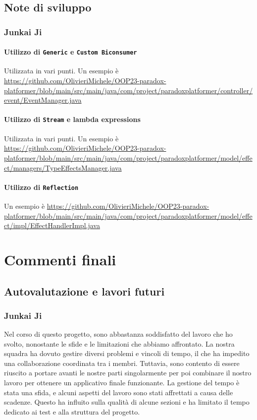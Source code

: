 \documentclass[a4paper,12pt]{report}
\begin{document}
\section{Note di sviluppo}

\subsection{Junkai Ji}

\subsubsection{Utilizzo di \texttt{Generic} e \texttt{Custom Biconsumer}}
Utilizzata in vari punti.
Un esempio è 
\url{https://github.com/OlivieriMichele/OOP23-paradox-platformer/blob/main/src/main/java/com/project/paradoxplatformer/controller/event/EventManager.java}

\subsubsection{Utilizzo di \texttt{Stream} e lambda expressions}
Utilizzata in vari punti.
Un esempio è 
\url{https://github.com/OlivieriMichele/OOP23-paradox-platformer/blob/main/src/main/java/com/project/paradoxplatformer/model/effect/managers/TypeEffectsManager.java}

\subsubsection{Utilizzo di \texttt{Reflection}}
Un esempio è 
\url{https://github.com/OlivieriMichele/OOP23-paradox-platformer/blob/main/src/main/java/com/project/paradoxplatformer/model/effect/impl/EffectHandlerImpl.java}

	
\chapter{Commenti finali}

\section{Autovalutazione e lavori futuri}

\subsection{Junkai Ji}
Nel corso di questo progetto, sono abbastanza soddisfatto del lavoro che ho svolto, nonostante le sfide e le limitazioni che abbiamo affrontato. La nostra squadra ha dovuto gestire diversi problemi e vincoli di tempo, il che ha impedito una collaborazione coordinata tra i membri. Tuttavia, sono contento di essere riuscito a portare avanti le nostre parti singolarmente per poi combinare il nostro lavoro per ottenere un applicativo finale funzionante. La gestione del tempo è stata una sfida, e alcuni aspetti del lavoro sono stati affrettati a causa delle scadenze. Questo ha influito sulla qualità di alcune sezioni e ha limitato il tempo dedicato ai test e alla struttura del progetto.
\end{document}
